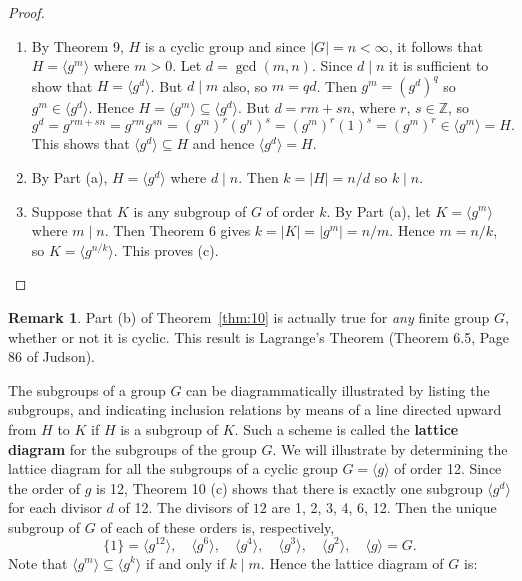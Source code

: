 \documentclass[11pt]{article}
\newcommand{\Z} {{\mathbb Z}}
\newcommand{\divides}{\ensuremath{\mid}}
\newcommand{\<}{\ensuremath{\langle}}
\renewcommand{\>}{\ensuremath{\rangle}}
\theoremstyle{plain}
\theoremstyle{definition}
\newtheorem{rem}[thm]{Remark}
\begin{document}
\begin{proof} \begin{enumerate}
\item By Theorem 9, $H$ is a cyclic group and since $|G|=n<\infty$,
it follows that $H=\langle g^m\rangle$ where $m>0$.  Let
$d=\gcd(m, n)$.  Since $d\divides n$ it is sufficient to show that
$H=\langle g^d\rangle$.  But $d\divides m$ also, so $m=qd$.  Then
$g^m=(g^d)^q$ so $g^m\in \langle g^d\rangle$.  Hence $H=\langle
g^m\rangle \subseteq \langle g^d\rangle$.  But $d=rm+ sn$, where
$r$, $s\in \Z$, so
$$g^d=g^{rm+sn}=g^{rm}g^{sn}=(g^m)^r(g^n)^s=(g^m)^r(1)^s=
(g^m)^r\in\langle g^m\rangle = H.$$
This shows that $\langle g^d \rangle \subseteq H$ and  hence
$\langle g^d\rangle = H$.

\item By Part (a), $H=\langle g^d\rangle$ where $d\divides n$.  Then $k=|H|=
n/d$ so $k\divides n$.

\item Suppose that $K$ is any subgroup of $G$ of order $k$.  By
Part (a), let $K=\langle g^m\rangle$ where $m\divides n$.  Then
Theorem 6 gives $k=|K| = |g^m| = n/m$.  Hence $m=n/k$, so
$K=\langle g^{n/k}\rangle$.  This proves (c).
\end{enumerate}
\end{proof}

\begin{rem} Part (b) of Theorem~\ref{thm:10} is actually true for {\it any} finite
group $G$, whether or not it is cyclic.  This result is Lagrange's
Theorem (Theorem 6.5, Page 86 of Judson).
\end{rem}


The subgroups of a group $G$ can be diagrammatically  illustrated
by listing the subgroups, and indicating inclusion relations by
means of a line directed upward from $H$ to $K$ if $H$ is a
subgroup of $K$.  Such a scheme is called the {\bf lattice
diagram} for the subgroups of the group $G$.  We will illustrate
by determining the lattice diagram for all the subgroups of a
cyclic group $G=\langle g\rangle$ of order 12.  Since the order of
$g$ is 12, Theorem 10 (c) shows that there is exactly one subgroup
$\langle g^d\rangle$ for each divisor $d$ of 12.  The divisors of
$12$ are 1, 2, 3, 4, 6, 12.  Then the unique subgroup of $G$ of
each of these orders is, respectively,
\[
\{1\}=\langle g^{12}\rangle,\quad \langle g^6\rangle, \quad
\langle g^4\rangle,\quad \langle g^3\rangle, \quad \langle
g^2\rangle , \quad \langle g\rangle = G.
\]
Note that $\langle
g^m\rangle \subseteq \langle g^k\rangle$ if and only if $k\divides m$.
Hence the lattice diagram of $G$ is:
\end{document}
